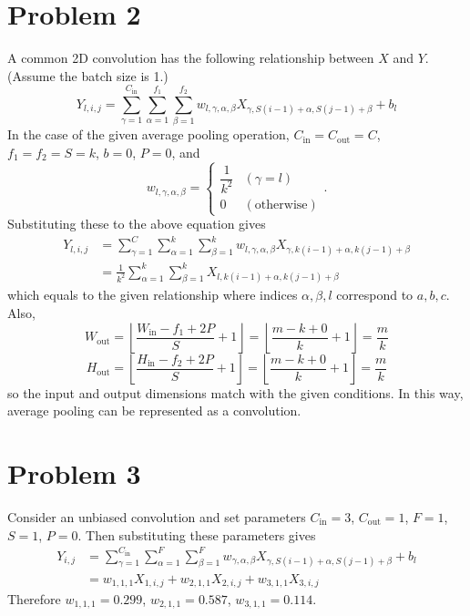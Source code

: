 \documentclass[10pt]{article}
\begin{document}
\section*{Problem 2}
A common 2D convolution has the following relationship between $X$ and $Y$. (Assume the batch size is 1.)
$$Y_{l, i, j} = \sum_{\gamma = 1}^{C_{\mathrm{in}}}\sum_{\alpha = 1}^{f_1}\sum_{\beta = 1}^{f_2}w_{l, \gamma, \alpha, \beta}X_{\gamma, S(i-1) + \alpha, S(j-1) + \beta} + b_{l}$$
In the case of the given average pooling operation, $C_{\mathrm{in}} = C_{\mathrm{out}} = C$, $f_1 = f_2 = S = k$, $b=0$, $P=0$, and $$w_{l,\gamma, \alpha, \beta} = \begin{cases}
    \dfrac{1}{k^2} & (\gamma = l) \\
    0 & (\mathrm{otherwise})
\end{cases}.$$
Substituting these to the above equation gives
\begin{align*}
    Y_{l, i, j} &= \sum_{\gamma = 1}^{C}\sum_{\alpha = 1}^{k}\sum_{\beta = 1}^{k}w_{l, \gamma, \alpha, \beta}X_{\gamma, k(i-1) + \alpha, k(j-1) + \beta} \\
    &= \frac{1}{k^2}\sum_{\alpha = 1}^{k}\sum_{\beta = 1}^{k}X_{l, k(i-1) + \alpha, k(j-1) + \beta}
\end{align*}
which equals to the given relationship where indices $\alpha, \beta, l$ correspond to $a, b, c$.
Also, 
$$W_{\mathrm{out}} = \left\lfloor{\frac{W_\mathrm{in} - f_1 + 2P}{S} + 1}\right\rfloor = \left\lfloor{\frac{m - k + 0}{k} + 1}\right\rfloor = \frac{m}{k}$$
$$H_{\mathrm{out}} = \left\lfloor{\frac{H_\mathrm{in} - f_2 + 2P}{S} + 1}\right\rfloor = \left\lfloor{\frac{m - k + 0}{k} + 1}\right\rfloor = \frac{m}{k}$$
so the input and output dimensions match with the given conditions.
In this way, average pooling can be represented as a convolution.

\section*{Problem 3}
Consider an unbiased convolution and set parameters $C_{\mathrm{in}} = 3$, $C_{\mathrm{out}} = 1$, $F = 1$, $S = 1$, $P = 0$. Then substituting these parameters gives
\begin{align*}
    Y_{i, j} &= \sum_{\gamma = 1}^{C_{\mathrm{in}}}\sum_{\alpha = 1}^{F}\sum_{\beta = 1}^{F}w_{\gamma, \alpha, \beta}X_{\gamma, S(i-1) + \alpha, S(j-1) + \beta} + b_{l} \\
    &= w_{1, 1, 1}X_{1, i, j} + w_{2, 1, 1}X_{2, i, j} + w_{3, 1, 1}X_{3, i, j}
\end{align*}
Therefore $w_{1, 1, 1} = 0.299$, $w_{2, 1, 1} = 0.587$, $w_{3, 1, 1} = 0.114$.
\end{document}
